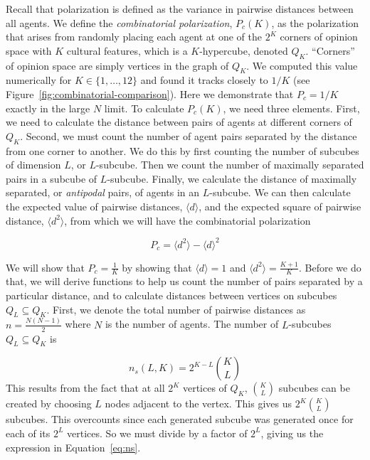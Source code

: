 Recall that polarization is defined as the variance in pairwise distances
between all agents. We define the \emph{combinatorial polarization}, $P_c(K)$, 
as the polarization that arises from randomly placing each agent at one of the $2^K$
corners of opinion space with $K$ cultural features, 
which is a $K$-hypercube, denoted $Q_K$. ``Corners'' of opinion space are 
simply vertices in the graph of $Q_K$.
We computed this value numerically for $K \in \{1, \ldots, 12\}$ and found it tracks
closely to $1/K$ (see Figure~\ref{fig:combinatorial-comparison}). 
Here we demonstrate that $P_c = 1/K$ exactly in the large $N$ limit.
To calculate $P_c(K)$, we need three elements. First, we need to
calculate the distance between pairs of agents at different corners of
$Q_K$. Second, we must count the number of agent pairs separated by the distance
from one corner to another. We do this by first counting the number of 
subcubes of dimension $L$, or $L$-subcube.
Then we count the number of maximally separated pairs in a subcube of 
$L$-subcube. Finally, we calculate the distance of maximally separated, 
or \emph{antipodal} pairs, of agents in an $L$-subcube. We can then calculate
the expected value of pairwise distances, $\langle d \rangle$, and the expected
square of pairwise distance, $\langle d^2 \rangle$, from which we will have the
combinatorial polarization 

\begin{equation}
  P_c = \langle d^2 \rangle - \langle d \rangle^2
\end{equation}

We will show that $P_c=\frac{1}{K}$ by showing that $\langle d \rangle = 1$ and
$\langle d^2 \rangle = \frac{K+1}{K}$. Before we do that, we will derive functions
to help us count the number of pairs separated by a particular distance, and
to calculate distances between vertices on subcubes $Q_L \subseteq Q_K$. First,
we denote the total number of pairwise distances as $n=\frac{N(N-1)}{2}$ where $N$ is
the number of agents. The number of $L$-subcubes $Q_L \subseteq Q_K$ is

\begin{equation}
  n_s(L, K) = 2^{K-L} {K \choose L}
  \label{eq:ns}
\end{equation}
\noindent
This results from the fact that at all $2^K$ vertices of $Q_K$, ${K \choose L}$
subcubes can be created by choosing $L$ nodes adjacent to the vertex. This 
gives us $2^K {K \choose L}$ subcubes. This overcounts since each 
generated subcube was generated once for each of its $2^L$ vertices. So we must
divide by a factor of $2^L$, giving us the expression in 
Equation~\ref{eq:ns}.%

